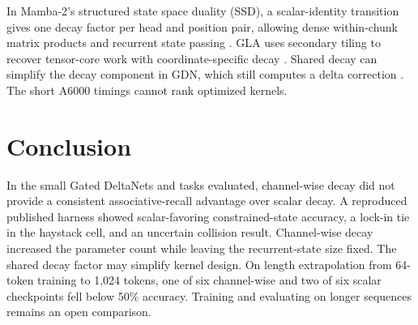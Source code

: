 \documentclass[conference]{IEEEtran}
\begin{document}
In Mamba-2's structured state space duality (SSD), a scalar-identity transition gives one decay factor per head and position pair, allowing dense within-chunk matrix products and recurrent state passing \cite{dao2024transformers}. GLA uses secondary tiling to recover tensor-core work with coordinate-specific decay \cite{yang2024gla}. Shared decay can simplify the decay component in GDN, which still computes a delta correction \cite{yang2025gdn,yang2024delta}. The short A6000 timings cannot rank optimized kernels.

\section{Conclusion}
In the small Gated DeltaNets and tasks evaluated, channel-wise decay did not provide a consistent associative-recall advantage over scalar decay. A reproduced published harness showed scalar-favoring constrained-state accuracy, a lock-in tie in the haystack cell, and an uncertain collision result. Channel-wise decay increased the parameter count while leaving the recurrent-state size fixed. The shared decay factor may simplify kernel design. On length extrapolation from 64-token training to 1,024 tokens, one of six channel-wise and two of six scalar checkpoints fell below 50\% accuracy. Training and evaluating on longer sequences remains an open comparison.



\end{document}
